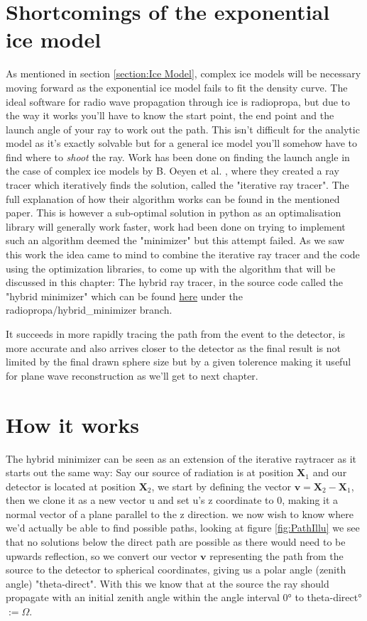 \documentclass[11pt,a4paper,faculty=we,language=en,doctype=report]{cls/ugent-doc}
\begin{document}
\section{Shortcomings of the exponential ice model}
As mentioned in section \ref{section:Ice Model}, complex ice models will be
necessary moving forward as the exponential ice model fails to fit the density
curve.  The ideal software for radio wave propagation through ice is
radiopropa\cite{Winchen_2019}, but due to the way it works you'll have to know
the start point, the end point and the launch angle of your ray to work out the
path. This isn't difficult for the analytic model as it's exactly solvable but
for a general ice model you'll somehow have to find where to \textit{shoot} the
ray.  Work has been done on finding the launch angle in the case of complex ice
models by B. Oeyen et al. \cite{2022icrc.confE1027O}, where they created a ray
tracer which iteratively finds the solution, called the "iterative ray tracer".
The full explanation of how their algorithm works can be found in the mentioned
paper.  This is however a sub-optimal solution in python as an optimalisation
library will generally work faster, work had been done on trying to implement
such an algorithm deemed the "minimizer" but this attempt failed.  As we saw
this work the idea came to mind to combine the iterative ray tracer and the
code using the optimization libraries, to come up with the algorithm that will
be discussed in this chapter: The hybrid ray tracer, in the source code called
the "hybrid minimizer" which can be found
\href{https://github.com/arthuradriaens-code/NuRadioMC.git}{here} under the
radiopropa/hybrid\_minimizer branch.

It succeeds in more rapidly tracing the path from the event to the detector, is
more accurate and also arrives closer to the detector as the final result is
not limited by the final drawn sphere size but by a given tolerence making it
useful for plane wave reconstruction as we'll get to next chapter.

\section{How it works}
The hybrid minimizer can be seen as an extension of the iterative raytracer
\cite{2022icrc.confE1027O} as it starts out the same way: Say our source of
radiation is at position $\mathbf{X}_1$ and our detector is located at position
$\mathbf{X}_2$, we start by defining the vector $\mathbf{v} = \mathbf{X}_2 -
\mathbf{X}_1$, then we clone it as a new vector u and set u's z coordinate to
0, making it a normal vector of a plane parallel to the z direction. we now
wish to know where we'd actually be able to find possible paths, looking at
figure \ref{fig:PathIllu} we see that no solutions below the direct path are
possible as there would need to be upwards reflection, so we convert our vector
$\mathbf{v}$ representing the path from the source to the detector to spherical
coordinates, giving us a polar angle (zenith angle) "theta-direct". With this
we know that at the source the ray should propagate with an initial zenith
angle within the angle interval 0° to theta-direct° $:= \Omega$.
\end{document}
